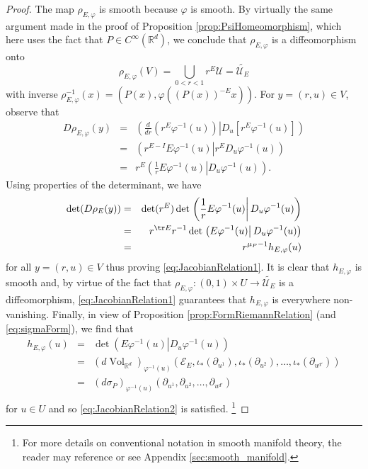 \documentclass[11pt, letter]{book}
\renewcommand\det{\operatorname{det}}
\newcommand{\Vol}{\operatorname{Vol}}
\begin{document}
\begin{proof}
The map $\rho_{E,\varphi}$ is smooth because $\varphi$ is smooth. By virtually the same argument made in the proof of Proposition \ref{prop:PsiHomeomorphism}, which here uses the fact that $P\in C^\infty(\mathbb{R}^d)$, we conclude that $\rho_{E,\varphi}$ is a diffeomorphism onto 
\begin{equation*}\rho_{E,\varphi}(V)=\bigcup_{0<r<1}r^E\mathcal{U}=\widetilde{\mathcal{U}_E}
\end{equation*}
with inverse $\rho_{E,\varphi}^{-1}(x)=(P(x),\varphi((P(x))^{-E}x))$. For $y=(r,u)\in V$, observe that
\begin{eqnarray*}
D\rho_{E,\varphi}(y)&=&\left.\left(\frac{d}{dr}(r^E\varphi^{-1}(u)) \right\vert D_u\left[r^E\varphi^{-1}(u)\right]\right)\\
&=&\left.\left(r^{E-I}E\varphi^{-1}(u)\right\vert r^E D_u\varphi^{-1}(u)\right)\\
&=&r^E\left.\left(\frac{1}{r}E\varphi^{-1}(u)\right\vert D_u\varphi^{-1}(u)\right).
\end{eqnarray*}
Using properties of the determinant, we have
\begin{eqnarray*}
    \det(D\rho_E(y))&=&\det(r^E)\det\left.\left(\frac{1}{r}E\varphi^{-1}(u)\right\vert D_u\varphi^{-1}(u)\right)\\
    &=&r^{\tr E}r^{-1}\det\left.\left(E\varphi^{-1}(u)\right\vert D_u\varphi^{-1}(u)\right)\\
    &=&r^{\mu_P-1}h_{E,\varphi}(u)
\end{eqnarray*}
for all $y=(r,u)\in V$ thus proving \eqref{eq:JacobianRelation1}. It is clear that $h_{E,\varphi}$ is smooth and, by virtue of the fact that $\rho_{E,\varphi}:(0,1)\times U\to \widetilde{\mathcal{U}_E}$ is a diffeomorphism, \eqref{eq:JacobianRelation1} guarantees that $h_{E,\varphi}$ is everywhere non-vanishing. Finally, 
in view of Proposition \ref{prop:FormRiemannRelation} (and \eqref{eq:sigmaForm}), we find that
\begin{eqnarray*}
    h_{E,\varphi}(u)&=&
    \det\left.\left(E\varphi^{-1}(u)\right\vert D_u\varphi^{-1}(u)\right)\\ \nonumber
    &=&
    (d\Vol_{\mathbb{R}^d})_{\varphi^{-1}(u)}(\mathcal{E}_E,\iota_*(\partial_{u^1}),\iota_*(\partial_{u^2}),\dots,\iota_*(\partial_{u^{d'}}))\\ \nonumber
    &=&\left(d\sigma_P\right)_{\varphi^{-1}(u)}(\partial_{u^1},\partial_{u^2},\dots,\partial_{u^{d'}})\\
\end{eqnarray*}
for $u\in U$ and so \eqref{eq:JacobianRelation2} is satisfied. \footnote{For more details on conventional notation in smooth manifold theory, the reader may reference \cite{lee_introduction_2003} or see Appendix \ref{sec:smooth_manifold}.}
\end{proof}
\end{document}
